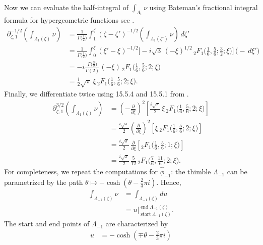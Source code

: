 \documentclass{article}
\newcommand{\fracderiv}[3]{\partial^{#1}_{#2, #3}}
\theoremstyle{definition}
\theoremstyle{plain}
\begin{document}
{Now we can evaluate the half-integral of $\int_{\Lambda_1} \nu$ using Bateman's fractional integral formula for hypergeometric functions see \cite[Section 4.1]{koornwinder2015fractional}.
\begin{align*}
\fracderiv{-1/2}{\zeta}{1} \left( \int_{\Lambda_1(\zeta)} \nu \right) & = \frac{1}{\Gamma\big(\tfrac{1}{2}\big)} \int_{1}^\zeta (\zeta - \zeta')^{-1/2} \left( \int_{\Lambda_1(\zeta')} \nu \right)\,d\zeta' \\
& = \frac{1}{\Gamma\big(\tfrac{1}{2}\big)} \int_0^\xi  (\xi' - \xi)^{-1/2} \Big[ -{i}{\sqrt{3}}\, (-\xi)^{1/2}\,{}_2F_1\big(\tfrac{1}{6}, \tfrac{5}{6}; \tfrac{3}{2}; \xi\big) \Big] \,\big( -\,d\xi' \big) \\
& = -i \frac{\Gamma\big(\tfrac{3}{2}\big)}{\Gamma(2)} (-\xi)\,{}_2F_1\big(\tfrac{1}{6}, \tfrac{5}{6}; 2; \xi\big) \\
& = \frac{i}{2} \sqrt{\pi}\,\xi\, {}_2F_1\big(\tfrac{1}{6}, \tfrac{5}{6}; 2; \xi\big).
\end{align*}
Finally, we differentiate twice using 15.5.4 and 15.5.1 from \cite{dlmf}.
\begin{align*}
\fracderiv{3/2}{\zeta}{1} \left( \int_{\Lambda_1(\zeta)} \nu \right) & = \left(-\tfrac{\partial}{\partial \xi}\right)^2 \left[ \frac{i\sqrt{\pi}}{2}\,\xi\, {}_2F_1\big(\tfrac{1}{6}, \tfrac{5}{6}; 2; \xi\big) \right] \\
& =  \tfrac{i\sqrt{\pi}}{2} \left(\tfrac{\partial}{\partial \xi}\right)^2 \left[ \xi\,{}_2F_1\big(\tfrac{1}{6}, \tfrac{5}{6}; 2; \xi\big) \right] \\
& = \tfrac{i\sqrt{\pi}}{2}\,\tfrac{\partial}{\partial \xi} \left[ {}_2F_1\big(\tfrac{1}{6}, \tfrac{5}{6}; 1; \xi\big) \right] \\
& = \tfrac{i\sqrt{\pi}}{2}\,\tfrac{5}{12}\, {}_2F_1\big(\tfrac{7}{6}, \tfrac{11}{6}; 2; \xi\big).
\end{align*}
%
For completeness, we repeat the computations for $\hat{\phi}_{-1}$: the thimble $\Lambda_{-1}$ can be parametrized by the path $\theta \mapsto -\cosh(\theta - \tfrac{2}{3}\pi i)$. Hence,
\begin{align*}
\int_{\Lambda_{-1}(\zeta)} \nu & = \int_{\Lambda_{-1}(\zeta)} du \\
& = u \Big|_{\operatorname{start} \Lambda_{-1}(\zeta)}^{\operatorname{end}\Lambda_{-1}(\zeta)}.
\end{align*}
The start and end points of $\Lambda_{-1}$ are characterized by
\begin{align*}
u & = -\cosh(\mp\theta - \tfrac{2}{3}\pi i) \\

\end{align*}}
\end{document}
